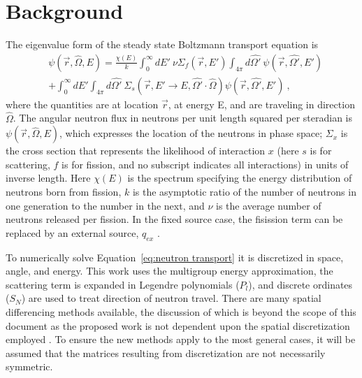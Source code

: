 \documentclass[preprint,12pt]{elsarticle}
\newcommand{\Sn}{\ensuremath{S_N}}
\newcommand{\Macro}{\ensuremath{\Sigma}}
\begin{document}
\section{Background}
\label{sec:background}
The eigenvalue form of the steady state Boltzmann transport equation is
\begin{align}
   [\hat{\Omega} \cdot \nabla + \Macro(\vec{r}, E)] &\psi(\vec{r}, \hat{\Omega}, E)  = \frac{\chi(E)}{k} \int_0^{\infty} dE' \:\nu \Macro_{f}(\vec{r}, E') \int_{4\pi} d\hat{\Omega'} \:\psi(\vec{r}, \hat{\Omega'}, E') \nonumber \\
   &+ \int_0^{\infty} dE' \int_{4\pi} d\hat{\Omega'} \:\Macro_{s}(\vec{r}, E' \to E, \hat{\Omega'} \cdot \hat{\Omega}) \psi(\vec{r}, \hat{\Omega'}, E') \:,
\label{eq:neutron transport}
\end{align}
%
\noindent where the quantities are at location $\vec{r}$, at energy E, and are traveling in direction $\hat{\Omega}$. The angular neutron flux in neutrons per unit length squared per steradian is $\psi(\vec{r}, \hat{\Omega}, E)$, which expresses the location of the neutrons in phase space; $\Macro_{x}$ is the cross section that represents the likelihood of interaction $x$ (here $s$ is for scattering, $f$ is for fission, and no subscript indicates all interactions) in units of inverse length. Here $\chi(E)$ is the spectrum specifying the energy distribution of neutrons born from fission, $k$ is the asymptotic ratio of the number of neutrons in one
generation to the number in the next, and $\nu$ is the average number of neutrons released per fission. In the fixed source case, the fisission term can be replaced by an external source, $q_{ex}$ \cite{Lewis1993}. 

To numerically solve Equation~\eqref{eq:neutron transport} it is discretized in space, angle, and energy. This work uses the multigroup energy approximation, the scattering term is expanded in Legendre polynomials ($P_l$), and discrete ordinates (\Sn) are used to treat direction of neutron travel. There are many spatial differencing methods available, the discussion of which is beyond the scope of this document as the proposed work is not dependent upon the spatial discretization employed \cite{Evans2009d}. To ensure the new methods apply to the most general cases, it will be assumed that the matrices resulting from discretization are not necessarily symmetric. 
\end{document}
